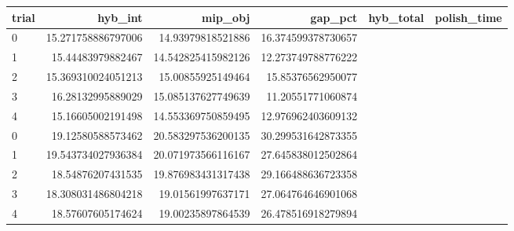 \begin{tabular}{lrrrrr}
\hline
trial & hyb_int & mip_obj & gap_pct & hyb_total & polish_time \\ \hline
0 & 15.271758886797006 & 14.93979818521886 & 16.374599378730657 &  &  \\
1 & 15.44483979882467 & 14.542825415982126 & 12.273749788776222 &  &  \\
2 & 15.369310024051213 & 15.00855925149464 & 15.85376562950077 &  &  \\
3 & 16.28132995889029 & 15.085137627749639 & 11.20551771060874 &  &  \\
4 & 15.16605002191498 & 14.553369750859495 & 12.976962403609132 &  &  \\
0 & 19.12580588573462 & 20.583297536200135 & 30.299531642873355 &  &  \\
1 & 19.543734027936384 & 20.071973566116167 & 27.645838012502864 &  &  \\
2 & 18.54876207431535 & 19.876983431317438 & 29.166488636723358 &  &  \\
3 & 18.308031486804218 & 19.01561997637171 & 27.064764646901068 &  &  \\
4 & 18.57607605174624 & 19.00235897864539 & 26.478516918279894 &  &  \\
\hline
\end{tabular}
